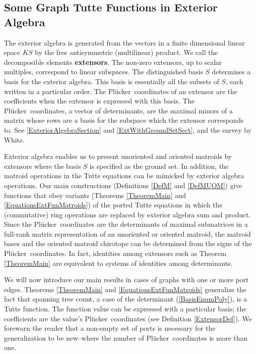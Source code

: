 \documentclass[12pt]{article}
\theoremstyle{definition}
\newcommand{\FieldK}{\ensuremath{K}}
\newcommand{\Plucker}{Pl\"{u}cker\ }
\begin{document}
\subsection{Some Graph Tutte Functions in Exterior Algebra}
\label{IntroGraphTutteFun}

The exterior algebra is generated from the vectors in a 
finite dimensional linear space $\FieldK S$ by the free antisymmetric 
(multilinear) product.  We call the decomposible elements \textbf{extensors}.
The non-zero extensors, up to scalar multiples, correspond to 
linear subspaces.  The distinguished basis $S$ determines a basis
for the exterior algebra.
This basis is essentially all the subsets of $S$,
each written in a particular order.  The \Plucker coordinates of
an extensor are the coefficients when the extensor is expressed with
this basis.  The \Plucker coordinates, a vector of determinants, are the 
maximal minors of a matrix whose rows are a basis for the subspace 
which the extensor corresponds to.  
See \textsection \ref{ExteriorAlgebraSection} and 
\textsection \ref{ExtWithGroundSetSect}, and the 
survey by White\cite{WhiteCayleyGeoAppl}.

Exterior algebra 
enables us to present unoriented and oriented matroids by 
extensors 
where the basis $S$ is specified as the ground set.  
In addition, the matroid operations
in the Tutte equations can be mimicked by exterior algebra operations.
Our main constructions (Definitions \ref{DefM} and \ref{DefMUOM})
give functions that obey variants 
(Theorems \ref{TheoremMain} and \ref{EquationsExtFunMatroids}) of the ported
Tutte equations in which the (commutative) ring operations are replaced
by exterior algebra sum and product.  Since the \Plucker coordinates
are the determinants of maximal submatrices in a full-rank matrix 
representation of an unoriented or oriented matroid, the matroid bases
and the oriented matroid chirotope can be determined from the 
signs of the \Plucker coordinates.  In fact, identities among extensors
such as Theorem \ref{TheoremMain} are equivalent to systems of identities
among determinants.

We will now introduce our main results in cases of graphs with
one or more port edges.  
Theorems \ref{TheoremMain} and \ref{EquationsExtFunMatroids}
generalize the fact that spanning tree count, a case of
the determinant (\ref{BasisEnumPoly}),
is a Tutte function.
The function value can be expressed with a particular
basis; the coefficients are 
the value's \Plucker coordinates (see Definition \ref{ExtensorDef}).  
We forewarn the reader that
a non-empty set of ports is necessary for the generalization
to be new--where the number of \Plucker coordinates
is more than one.
\end{document}

